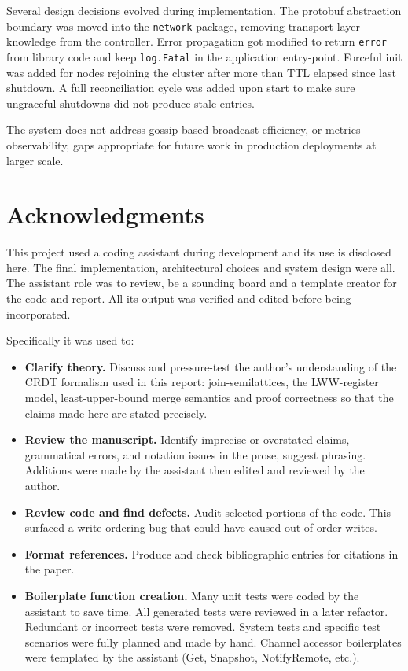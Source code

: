 \documentclass[conference]{IEEEtran}
\begin{document}
Several design decisions evolved during implementation. The protobuf
abstraction boundary was moved into the \texttt{network} package, removing
transport-layer knowledge from the controller. Error propagation got modified
to return \texttt{error} from library code and keep
\texttt{log.Fatal} in the application entry-point. Forceful init was added
for nodes rejoining the cluster after more than TTL elapsed since last shutdown. A full
reconciliation cycle was added upon start to make sure ungraceful shutdowns did not
produce stale entries.

The system does not address gossip-based broadcast efficiency, or metrics
observability, gaps appropriate for future work in production
deployments at larger scale.

\section*{Acknowledgments}

This project used a coding assistant during development and its use is disclosed here.
The final implementation, architectural choices and system design were all.
The assistant role was to review, be a sounding board and a template creator for the code and report.
All its output was verified and edited before being incorporated.

Specifically it was used to:
\begin{itemize}
  \item \textbf{Clarify theory.} Discuss and pressure-test the author's understanding
    of the CRDT formalism used in this report: join-semilattices, the LWW-register
    model, least-upper-bound merge semantics and proof correctness so that the claims
    made here are stated precisely.
  \item \textbf{Review the manuscript.} Identify imprecise or overstated claims,
    grammatical errors, and notation issues in the prose, suggest phrasing.
    Additions were made by the assistant then edited and reviewed by the author.
  \item \textbf{Review code and find defects.} Audit selected portions of the code.
    This surfaced a write-ordering bug that could have caused out of order writes.
  \item \textbf{Format references.} Produce and check bibliographic entries for
    citations in the paper.
  \item \textbf{Boilerplate function creation.} Many unit tests were coded by the assistant to save time.
    All generated tests were reviewed in a later refactor. Redundant or incorrect tests were removed.
    System tests and specific test scenarios were fully planned and made by hand.
    Channel accessor boilerplates were templated by the assistant (Get, Snapshot, NotifyRemote, etc.).
\end{itemize}
\end{document}
